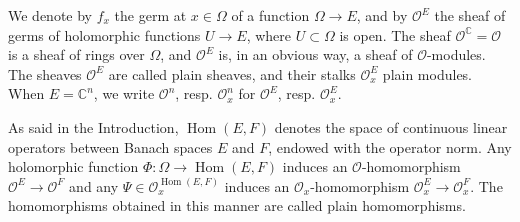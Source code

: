 \documentclass{amsart}
\numberwithin{equation}{section}
\theoremstyle{definition}
\theoremstyle{plain}
\theoremstyle{remark}
\begin{document}
We denote by $f_x$ the germ at $x\in\Omega$ of a function $\Omega\rightarrow E$,
and by ${\ensuremath{\mathcal{{O}}}}^E$ the sheaf of germs of holomorphic functions $U\rightarrow E$, where $U\subset\Omega$ is open. The sheaf ${\ensuremath{\mathcal{{O}}}}^\mathbb{C}={\ensuremath{\mathcal{{O}}}}$
is a sheaf of rings over $\Omega$, and ${\ensuremath{\mathcal{{O}}}}^E$ is, in an obvious way,
a sheaf of ${\ensuremath{\mathcal{{O}}}}$-modules.
The sheaves ${\ensuremath{\mathcal{{O}}}}^E$ are called plain sheaves, and their stalks ${\ensuremath{\mathcal{{O}}}}^E_x$ plain modules. When $E=\mathbb{C}^n$, we write ${\ensuremath{\mathcal{{O}}}}^n$,
resp. ${\ensuremath{\mathcal{{O}}}}^n_x$ for ${\ensuremath{\mathcal{{O}}}}^E$, resp. ${\ensuremath{\mathcal{{O}}}}^E_x$.

As said in the Introduction, ${{\mathop{\mathrm{Hom}}}}(E,F)$ denotes the space of continuous linear operators between Banach spaces $E$ and $F$, endowed with the operator norm. 
Any holomorphic function $\Phi:\Omega\rightarrow{{\mathop{\mathrm{Hom}}}}(E,F)$ induces an ${\ensuremath{\mathcal{{O}}}}$-homomorphism ${\ensuremath{\mathcal{{O}}}}^E\rightarrow{\ensuremath{\mathcal{{O}}}}^F$ and any $\Psi\in{\ensuremath{\mathcal{{O}}}}_x^{{{\mathop{\mathrm{Hom}}}}(E,F)}$
induces an ${\ensuremath{\mathcal{{O}}}}_x$-homomorphism ${\ensuremath{\mathcal{{O}}}}^E_x\rightarrow{\ensuremath{\mathcal{{O}}}}^F_x$.
The homomorphisms obtained in this manner are called plain homomorphisms.
\end{document}
